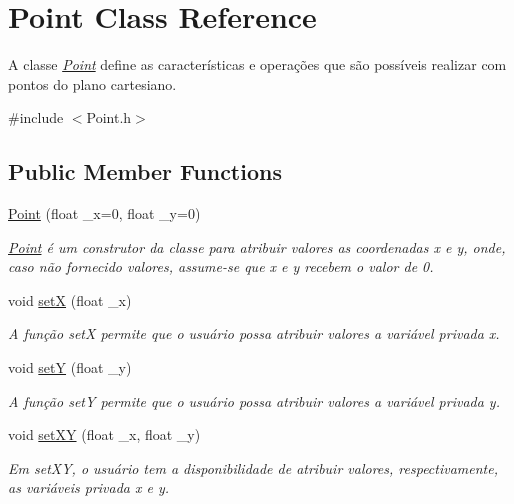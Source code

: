 \hypertarget{class_point}{}\section{Point Class Reference}
\label{class_point}


A classe {\itshape \hyperlink{class_point}{Point}} define as características e operações que são possíveis realizar com pontos do plano cartesiano.  




{\ttfamily \#include $<$Point.\+h$>$}

\subsection*{Public Member Functions}
\begin{DoxyCompactItemize}
\item 
\hyperlink{class_point_a06c32166c2ad9eac25799ef189b49683}{Point} (float \+\_\+x=0, float \+\_\+y=0)
\begin{DoxyCompactList}\small\item\em {\itshape \hyperlink{class_point}{Point}} é um construtor da classe para atribuir valores as coordenadas x e y, onde, caso não fornecido valores, assume-\/se que x e y recebem o valor de 0. \end{DoxyCompactList}\item 
void \hyperlink{class_point_a428a1676e2fdec6753c42011a1d59d18}{setX} (float \+\_\+x)
\begin{DoxyCompactList}\small\item\em A função {\itshape setX} permite que o usuário possa atribuir valores a variável privada x. \end{DoxyCompactList}\item 
void \hyperlink{class_point_a9868c4601b0ea0c2d0de20fe41ee0e49}{setY} (float \+\_\+y)
\begin{DoxyCompactList}\small\item\em A função {\itshape setY} permite que o usuário possa atribuir valores a variável privada y. \end{DoxyCompactList}\item 
void \hyperlink{class_point_ab5385c6d9bfa841e641e4709fc9f14cc}{set\+XY} (float \+\_\+x, float \+\_\+y)
\begin{DoxyCompactList}\small\item\em Em {\itshape set\+XY}, o usuário tem a disponibilidade de atribuir valores, respectivamente, as variáveis privada x e y. \end{DoxyCompactList}\item 

\end{DoxyCompactItemize}
